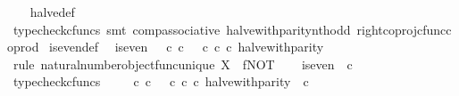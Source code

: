\begin{isabellebody}
%
\isadelimproof
\ \ %
\endisadelimproof
%
\isatagproof
{}\isamarkupfalse%
\ halve{\isacharunderscore}{\kern0pt}def\ \isamarkupfalse%
\ {\isacharparenleft}{\kern0pt}typecheck{\isacharunderscore}{\kern0pt}cfuncs{\isacharcomma}{\kern0pt}\ smt\ comp{\isacharunderscore}{\kern0pt}associative{}\ halve{\isacharunderscore}{\kern0pt}with{\isacharunderscore}{\kern0pt}parity{\isacharunderscore}{\kern0pt}nth{\isacharunderscore}{\kern0pt}odd\ right{\isacharunderscore}{\kern0pt}coproj{\isacharunderscore}{\kern0pt}cfunc{\isacharunderscore}{\kern0pt}coprod{\isacharparenright}{\kern0pt}%
\endisatagproof
{\isafoldproof}%
%
\isadelimproof
\isanewline
%
\endisadelimproof
\isanewline
{}\isamarkupfalse%
\ is{\isacharunderscore}{\kern0pt}even{\isacharunderscore}{\kern0pt}def{}{\isacharcolon}{\kern0pt}\isanewline
\ \ {\isachardoublequoteopen}is{\isacharunderscore}{\kern0pt}even\ {\isacharequal}{\kern0pt}\ {\isacharparenleft}{\kern0pt}{\isacharparenleft}{\kern0pt}{\isasymt}\ {\isasymcirc}\isactrlsub c\ {\isasymbeta}\isactrlbsub {\isasymnat}\isactrlsub c\isactrlesub {\isacharparenright}{\kern0pt}\ {\isasymamalg}\ {\isacharparenleft}{\kern0pt}{\isasymf}\ {\isasymcirc}\isactrlsub c\ {\isasymbeta}\isactrlbsub {\isasymnat}\isactrlsub c\isactrlesub {\isacharparenright}{\kern0pt}{\isacharparenright}{\kern0pt}\ {\isasymcirc}\isactrlsub c\ halve{\isacharunderscore}{\kern0pt}with{\isacharunderscore}{\kern0pt}parity{\isachardoublequoteclose}\isanewline
%
\isadelimproof
%
\endisadelimproof
%
\isatagproof
{}\isamarkupfalse%
\ {\isacharparenleft}{\kern0pt}rule\ natural{\isacharunderscore}{\kern0pt}number{\isacharunderscore}{\kern0pt}object{\isacharunderscore}{\kern0pt}func{\isacharunderscore}{\kern0pt}unique{\isacharbrackleft}{\kern0pt}\ X{\isacharequal}{\kern0pt}{\isasymOmega}{\isacharcomma}{\kern0pt}\ \ f{\isacharequal}{\kern0pt}NOT{\isacharbrackright}{\kern0pt}{\isacharparenright}{\kern0pt}\isanewline
\ \ \isamarkupfalse%
\ {\isachardoublequoteopen}is{\isacharunderscore}{\kern0pt}even\ {\isacharcolon}{\kern0pt}\ {\isasymnat}\isactrlsub c\ {\isasymrightarrow}\ {\isasymOmega}{\isachardoublequoteclose}\isanewline
\ \ \ \ \isamarkupfalse%
\ typecheck{\isacharunderscore}{\kern0pt}cfuncs\isanewline
\ \ \isamarkupfalse%
\ {\isachardoublequoteopen}{\isacharparenleft}{\kern0pt}{\isasymt}\ {\isasymcirc}\isactrlsub c\ {\isasymbeta}\isactrlbsub {\isasymnat}\isactrlsub c\isactrlesub {\isacharparenright}{\kern0pt}\ {\isasymamalg}\ {\isacharparenleft}{\kern0pt}{\isasymf}\ {\isasymcirc}\isactrlsub c\ {\isasymbeta}\isactrlbsub {\isasymnat}\isactrlsub c\isactrlesub {\isacharparenright}{\kern0pt}\ {\isasymcirc}\isactrlsub c\ halve{\isacharunderscore}{\kern0pt}with{\isacharunderscore}{\kern0pt}parity\ {\isacharcolon}{\kern0pt}\ {\isasymnat}\isactrlsub c\ {\isasymrightarrow}\ {\isasymOmega}{\isachardoublequoteclose}\isanewline

\end{isabellebody}
